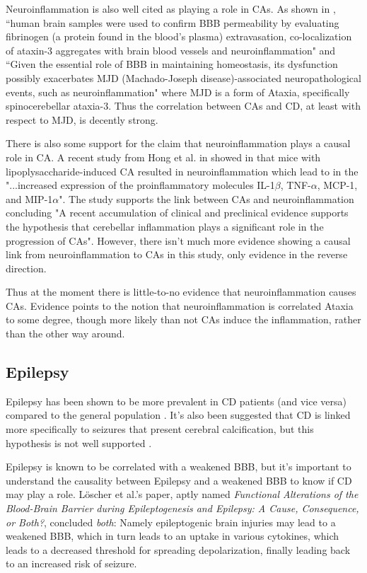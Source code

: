 \documentclass{article}
\begin{document}
Neuroinflammation is also well cited as playing a role in CAs. As shown in \cite{Duarte}, ``human  brain  samples  were  used  to  confirm  BBB  permeability  by evaluating  fibrinogen (a protein found in the blood's plasma)  extravasation,  co-localization  of  ataxin-3  aggregates with brain blood vessels and neuroinflammation" and ``Given the essential role of BBB in maintaining homeostasis, its dysfunction possibly exacerbates MJD (Machado-Joseph disease)-associated neuropathological events, such as neuroinflammation" where MJD is a form of Ataxia, specifically spinocerebellar ataxia-3. Thus the correlation between CAs and CD, at least with respect to MJD, is decently strong.

There is also some support for the claim that neuroinflammation plays a causal role in CA. A recent study from Hong et al. in \cite{Hong} showed in that mice with lipoplysaccharide-induced CA resulted in neuroinflammation which lead to in the "...increased expression of the proinflammatory molecules IL-1$\beta$, TNF-$\alpha$, MCP-1, and MIP-1$\alpha$". The study supports the link between CAs and neuroinflammation concluding "A recent accumulation of clinical and preclinical evidence supports the hypothesis that cerebellar inflammation plays a significant role in the progression of CAs". However, there isn't much more evidence showing a causal link from neuroinflammation to CAs in this study, only evidence in the reverse direction.

Thus at the moment there is little-to-no evidence that neuroinflammation causes CAs. Evidence points to the notion that neuroinflammation is correlated Ataxia to some degree, though more likely than not CAs induce the inflammation, rather than the other way around. 

\subsection{Epilepsy}

Epilepsy has been shown to be more prevalent in CD patients (and vice versa) compared to the general population \cite{Bushara}. It's also been suggested that CD is linked more specifically to seizures that present cerebral calcification, but this hypothesis is not well supported \cite{Bushara}. 

Epilepsy is known to be correlated with a weakened BBB, but it's important to understand the causality between Epilepsy and a weakened BBB to know if CD may play a role. Löscher et al.'s paper, aptly named \textit{Functional Alterations of the Blood-Brain Barrier during Epileptogenesis and Epilepsy: A Cause, Consequence, or Both?}, concluded \textit{both}: Namely epileptogenic brain injuries may lead to a weakened BBB, which in turn leads to an uptake in various cytokines, which leads to a decreased threshold for spreading depolarization, finally leading back to an increased risk of seizure\cite{Loscher}. 
\end{document}
